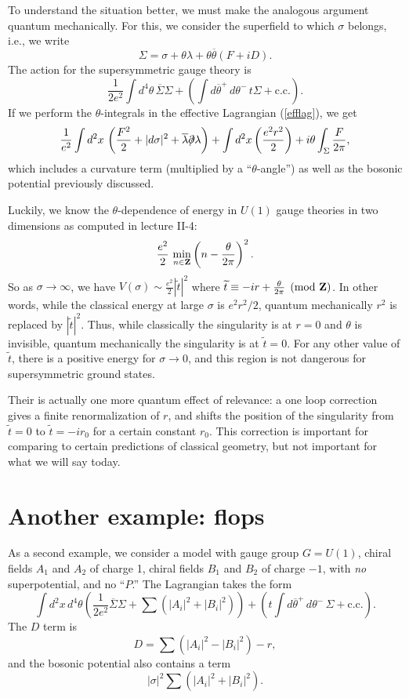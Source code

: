 To understand the situation better, we must make the analogous
argument quantum mechanically.
For this, we consider the superfield to which $\sigma$ belongs, i.e., we write
$$\Sigma=\sigma+\theta\lambda+\theta\overline{\theta}(F+iD).$$
The action for the supersymmetric gauge theory is
\begin{equation}\label{efflag}
\frac1{2e^2}\int d^4\theta\,\overline{\Sigma}\Sigma +\left(\int
d\overline{\theta}^+\,d\theta^-\, t\Sigma
+ \mbox{c.c.}\right).
\end{equation}
If we perform the
$\theta$-integrals in the effective Lagrangian (\ref{efflag}), we get
$${1\over e^2}\int d^2x\,\left(
\frac{F^2}{2}+|d\sigma|^2+\overline{\lambda}\dirac
\lambda\right)
+\int d^2x\left(\frac{e^2r^2}2\right)+i\theta\int_\Sigma\frac{F}{2\pi},$$
which includes a curvature term (multiplied by a ``$\theta$-angle'') as well
as the bosonic potential previously discussed.

Luckily, we know the $\theta$-dependence of energy in $U(1)$ gauge theories
in two dimensions as computed in lecture II-4:
$$\frac{e^2}2\,\min_{n\in{\bf Z}}\left(n-\frac\theta{2\pi}\right)^2.$$
So as $\sigma\to\infty$, we have $V(\sigma)\sim\frac{e^2}2|\widetilde{t}|^2$
where $\widetilde{t}\equiv -ir+\frac\theta{2\pi}\pmod {\bf Z}$.
In other words, while the classical energy at large $\sigma$ is
$e^2r^2/2$, quantum mechanically $r^2$ is replaced by $|\widetilde t|^2$.
Thus, while classically the singularity is at $r=0$ and $\theta$ is
invisible, quantum mechanically the singularity is at $\widetilde t=0$.
For any other value of $\widetilde t$, there is a positive energy for
$\sigma\to 0$, and this region is not dangerous for supersymmetric
ground states.

Their is actually one more quantum effect of relevance: a one loop
correction gives a finite renormalization of $r$, and shifts the
position of the singularity from $\widetilde t=0$ to $\widetilde t=-ir_0$
for  a certain constant $r_0$.  This correction is important for
comparing to certain predictions of classical geometry, but not
important for what we will say today.

\section{Another example: flops}

As a second example, we consider a model with gauge group $G=U(1)$, chiral
fields
$A_1$ and $A_2$ of charge 1,  chiral fields $B_1$ and $B_2$ of charge $-1$,
with
{\it no}\/ superpotential, and no ``$P$.''  The Lagrangian takes the form
$$\int d^2x\,d^4\theta\left(\frac1{2e^2}\overline{\Sigma}\Sigma
+\sum(|A_i|^2+|B_i|^2)\right)
+\left(t\int d\overline{\theta}^+\,d\theta^-\,\Sigma + \mbox{c.c.}\right).$$
The $D$ term is
$$D=\sum(|A_i|^2-|B_i|^2)-r,$$
and the bosonic potential also contains a term
$$|\sigma|^2\sum(|A_i|^2+|B_i|^2).$$

